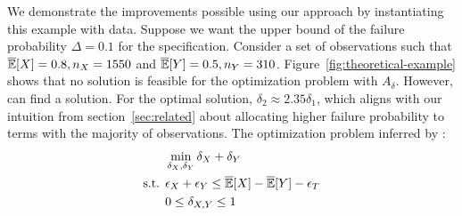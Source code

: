 We demonstrate the improvements possible using our approach by instantiating this example with data. 
Suppose we want the upper bound of the failure probability $\Delta = 0.1$ for the specification.
Consider a set of observations such that $\overline{\mathbb{E}}[X] = 0.8, n_X = 1550$ and $\overline{\mathbb{E}}[Y] = 0.5, n_Y = 310$.
Figure~\ref{fig:theoretical-example} shows that no solution is feasible for the optimization problem with $A_\delta$.
However, \AVOIRmethodname{} can find a solution.
For the optimal solution, $\delta_2 \approx 2.35\delta_1$, which aligns with our intuition from section~\ref{sec:related} about allocating higher failure probability to terms with the majority of observations. 
The optimization problem inferred by \AVOIRmethodname{}:
\begin{align}
    \begin{split}
        &\min\limits_{\delta_X, \delta_Y}{\delta_X + \delta_Y} \\
        \text{s.t.  } &\epsilon_X + \epsilon_Y \leq \overline{\mathbb{E}}[X] - \overline{\mathbb{E}}[Y] - \epsilon_T \\
        &0\leq \delta_{X,Y} \leq 1
    \end{split}
\end{align}



 


